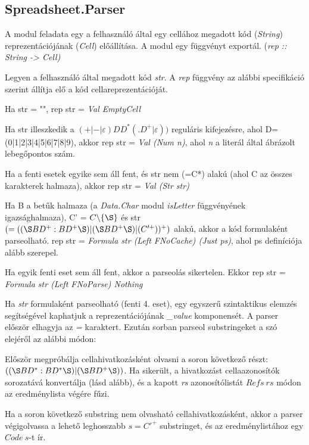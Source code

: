 \subsection{Spreadsheet.Parser}

A modul feladata egy a felhasználó által egy cellához megadott kód (\textit{String}) reprezentációjának (\textit{Cell}) előállítása. A modul egy függvényt exportál. (\textit{rep :: String -> Cell)}

Legyen a felhasználó által megadott kód \textit{str}. A \textit{rep} függvény az alábbi specifikáció szerint állítja elő a kód cellareprezentációját.

\begin{compactenum}
	\item Ha str = "", rep str = \textit{Val EmptyCell}
	\item Ha str illeszkedik a $(+|-|\varepsilon)DD^*(.D^+|\varepsilon))$ reguláris kifejezésre, ahol D=(0|1|2|3|4|5|6|7|8|9), akkor rep str = \textit{Val (Num n)}, ahol \textit{n} a literál által ábrázolt lebegőpontos szám. 
	\item Ha a fenti esetek egyike sem áll fent, és str nem (=C*) alakú (ahol C az összes karakterek halmaza), akkor rep str = \textit{Val (Str str)}
	\item Ha B a betűk halmaza (a \textit{Data.Char} modul \textit{isLetter} függvényének igazsághalmaza), C' = $C \backslash \{\S\}$ és str $(=((\S  BD^+:BD^+\S )|(\S BD^+\S )|(C'^+))^+)$ alakú, akkor a kód formulaként parseolható. rep str = \textit{Formula str (Left FNoCache) (Just ps)}, ahol ps definíciója alább szerepel.
	\item Ha egyik fenti eset sem áll fent, akkor a parseolás sikertelen. Ekkor rep str = \textit{Formula str (Left FNoParse) Nothing}
\end{compactenum}

Ha \textit{str} formulaként parseolható (fenti 4. eset), egy egyszerű szintaktikus elemzés segítségével kaphatjuk a reprezentációjának \textit{\_value} komponensét. A parser először elhagyja az \textit{=} karaktert. Ezután sorban parseol substringeket a szó elejéről az alábbi módon:
\begin{compactenum}
	\item Először megpróbálja cellahivatkozásként olvasni a soron következő részt: $((\S  BD^*:BD^*\S )|(\S BD^+\S ))$. Ha sikerült, a hivatkozást cellaazonosítók sorozatává konvertálja (lásd alább), és a kapott \textit{rs} azonosítólistát $Refs\ rs$ módon az eredménylista végére fűzi.
	\item Ha a soron következő substring nem olvasható cellahivatkozásként, akkor a parser végigolvassa a lehető leghosszabb $s = C'^+$ substringet, és az eredménylistához egy $Code\ s$-t ír.
\end{compactenum}

